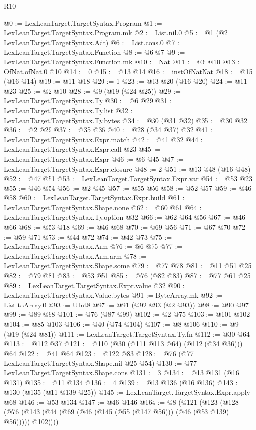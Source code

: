 \begin{lexlean}{R10}
\begin{coremodule}
@0 := LexLeanTarget.TargetSyntax.Program
@1 := LexLeanTarget.TargetSyntax.Program.mk
@2 := List.nil.{0}
@5 := @1 (@2 LexLeanTarget.TargetSyntax.Adt)
@6 := List.cons.{0}
@7 := LexLeanTarget.TargetSyntax.Function
@8 := @6 @7
@9 := LexLeanTarget.TargetSyntax.Function.mk
@10 := Nat
@11 := @6 @10
@13 := OfNat.ofNat.{0} @10
@14 := 0
@15 := @13 @14
@16 := instOfNatNat
@18 := @15 (@16 @14)
@19 := @11 @18
@20 := 1
@23 := @13 @20 (@16 @20)
@24 := @11 @23
@25 := @2 @10
@28 := @9 (@19 (@24 @25))
@29 := LexLeanTarget.TargetSyntax.Ty
@30 := @6 @29
@31 := LexLeanTarget.TargetSyntax.Ty.list
@32 := LexLeanTarget.TargetSyntax.Ty.bytes
@34 := @30 (@31 @32)
@35 := @30 @32
@36 := @2 @29
@37 := @35 @36
@40 := @28 (@34 @37) @32
@41 := LexLeanTarget.TargetSyntax.Expr.match
@42 := @41 @32
@44 := LexLeanTarget.TargetSyntax.Expr.call @23
@45 := LexLeanTarget.TargetSyntax.Expr
@46 := @6 @45
@47 := LexLeanTarget.TargetSyntax.Expr.closure
@48 := 2
@51 := @13 @48 (@16 @48)
@52 := @47 @51
@53 := LexLeanTarget.TargetSyntax.Expr.var
@54 := @53 @23
@55 := @46 @54
@56 := @2 @45
@57 := @55 @56
@58 := @52 @57
@59 := @46 @58
@60 := LexLeanTarget.TargetSyntax.Expr.build
@61 := LexLeanTarget.TargetSyntax.Shape.none
@62 := @60 @61
@64 := LexLeanTarget.TargetSyntax.Ty.option @32
@66 := @62 @64 @56
@67 := @46 @66
@68 := @53 @18
@69 := @46 @68
@70 := @69 @56
@71 := @67 @70
@72 := @59 @71
@73 := @44 @72
@74 := @42 @73
@75 := LexLeanTarget.TargetSyntax.Arm
@76 := @6 @75
@77 := LexLeanTarget.TargetSyntax.Arm.arm
@78 := LexLeanTarget.TargetSyntax.Shape.some
@79 := @77 @78
@81 := @11 @51 @25
@82 := @79 @81
@83 := @53 @51
@85 := @76 (@82 @83)
@87 := @77 @61 @25
@89 := LexLeanTarget.TargetSyntax.Expr.value @32
@90 := LexLeanTarget.TargetSyntax.Value.bytes
@91 := ByteArray.mk
@92 := List.toArray.{0}
@93 := UInt8
@97 := @91 (@92 @93 (@2 @93))
@98 := @90 @97
@99 := @89 @98
@101 := @76 (@87 @99)
@102 := @2 @75
@103 := @101 @102
@104 := @85 @103
@106 := @40 (@74 @104)
@107 := @8 @106
@110 := @9 (@19 (@24 @81))
@111 := LexLeanTarget.TargetSyntax.Ty.fn
@112 := @30 @64
@113 := @112 @37
@121 := @110 (@30 (@111 @113 @64) (@112 (@34 @36))) @64
@122 := @41 @64
@123 := @122 @83
@128 := @76 (@77 LexLeanTarget.TargetSyntax.Shape.nil @25 @54)
@130 := @77 LexLeanTarget.TargetSyntax.Shape.cons
@131 := 3
@134 := @13 @131 (@16 @131)
@135 := @11 @134
@136 := 4
@139 := @13 @136 (@16 @136)
@143 := @130 (@135 (@11 @139 @25))
@145 := LexLeanTarget.TargetSyntax.Expr.apply @68
@146 := @53 @134
@147 := @46 @146
@164 := @8
    (@121
      (@123
        (@128 (@76 (@143 (@44 (@69 (@46 (@145 (@55 (@147 @56))) (@46 (@53 @139) @56))))) @102))))

\end{coremodule}
\end{lexlean}
